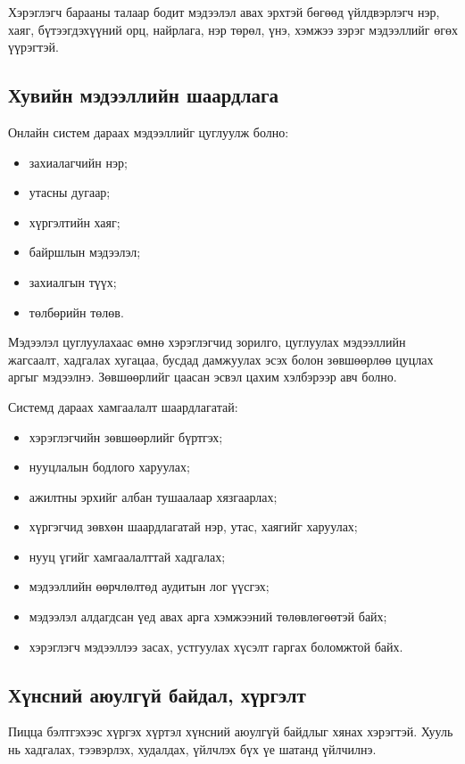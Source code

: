 Хэрэглэгч барааны талаар бодит мэдээлэл авах эрхтэй бөгөөд үйлдвэрлэгч нэр, хаяг, бүтээгдэхүүний орц, найрлага, нэр төрөл, үнэ, хэмжээ зэрэг мэдээллийг өгөх үүрэгтэй.

\subsection{Хувийн мэдээллийн шаардлага}
Онлайн систем дараах мэдээллийг цуглуулж болно:
\begin{itemize}
    \item захиалагчийн нэр;
    \item утасны дугаар;
    \item хүргэлтийн хаяг;
    \item байршлын мэдээлэл;
    \item захиалгын түүх;
    \item төлбөрийн төлөв.
\end{itemize}

Мэдээлэл цуглуулахаас өмнө хэрэглэгчид зорилго, цуглуулах мэдээллийн жагсаалт, хадгалах хугацаа, бусдад дамжуулах эсэх болон зөвшөөрлөө цуцлах аргыг мэдээлнэ. Зөвшөөрлийг цаасан эсвэл цахим хэлбэрээр авч болно.

Системд дараах хамгаалалт шаардлагатай:
\begin{itemize}
    \item хэрэглэгчийн зөвшөөрлийг бүртгэх;
    \item нууцлалын бодлого харуулах;
    \item ажилтны эрхийг албан тушаалаар хязгаарлах;
    \item хүргэгчид зөвхөн шаардлагатай нэр, утас, хаягийг харуулах;
    \item нууц үгийг хамгаалалттай хадгалах;
    \item мэдээллийн өөрчлөлтөд аудитын лог үүсгэх;
    \item мэдээлэл алдагдсан үед авах арга хэмжээний төлөвлөгөөтэй байх;
    \item хэрэглэгч мэдээллээ засах, устгуулах хүсэлт гаргах боломжтой байх.
\end{itemize}

\subsection{Хүнсний аюулгүй байдал, хүргэлт}

Пицца бэлтгэхээс хүргэх хүртэл хүнсний аюулгүй байдлыг хянах хэрэгтэй. Хууль нь хадгалах, тээвэрлэх, худалдах, үйлчлэх бүх үе шатанд үйлчилнэ.


